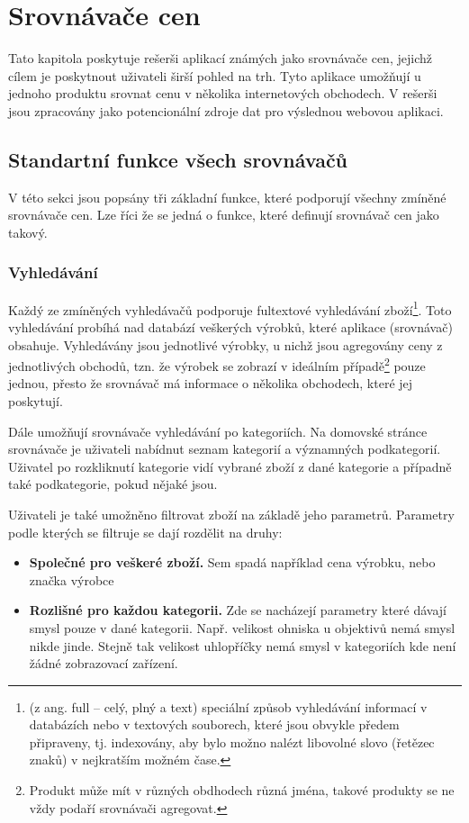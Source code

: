 \section{Srovnávače cen}
\label{sec:srovnavace-cen}
Tato kapitola poskytuje rešerši aplikací známých jako srovnávače cen, jejichž cílem je poskytnout uživateli širší pohled na trh. Tyto aplikace umožňují u jednoho produktu srovnat cenu v několika internetových obchodech. V rešerši jsou zpracovány jako potencionální zdroje dat pro výslednou webovou aplikaci.

\subsection{Standartní funkce všech srovnávačů}
V této sekci jsou popsány tři základní funkce, které podporují všechny zmíněné srovnávače cen. Lze říci že se jedná o funkce, které definují srovnávač cen jako takový.

\subsubsection{Vyhledávání}
Každý ze zmíněných vyhledávačů podporuje fultextové vyhledávání zboží\footnote{(z ang. full – celý, plný a text) speciální způsob vyhledávání informací v databázích nebo v textových souborech, které jsou obvykle předem připraveny, tj. indexovány, aby bylo možno nalézt libovolné slovo (řetězec znaků) v nejkratším možném čase.}. Toto vyhledávání probíhá nad databází veškerých výrobků, které aplikace (srovnávač) obsahuje. Vyhledávány jsou jednotlivé výrobky, u nichž jsou agregovány ceny z jednotlivých obchodů, tzn. že výrobek se zobrazí v ideálním případě\footnote{Produkt může mít v různých obdhodech různá jména, takové produkty se ne vždy podaří srovnávači agregovat.} pouze jednou, přesto že srovnávač má informace o několika obchodech, které jej poskytují.

Dále umožňují srovnávače vyhledávání po kategoriích. Na domovské stránce srovnávače je uživateli nabídnut seznam kategorií a významných podkategorií. Uživatel po rozkliknutí kategorie vidí vybrané zboží z dané kategorie a případně také podkategorie, pokud nějaké jsou.

Uživateli je také umožněno filtrovat zboží na základě jeho parametrů. Parametry podle kterých se filtruje se dají rozdělit na druhy:
\begin{itemize}
\item \textbf{Společné pro veškeré zboží.} Sem spadá například cena výrobku, nebo značka výrobce
\item \textbf{Rozlišné pro každou kategorii.} Zde se nacházejí parametry které dávají smysl pouze v dané kategorii. Např. velikost ohniska u objektivů nemá smysl nikde jinde. Stejně tak velikost uhlopříčky nemá smysl v kategoriích kde není žádné zobrazovací zařízení.
\end{itemize}

